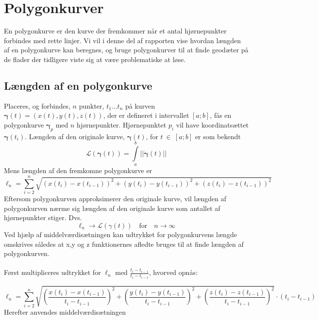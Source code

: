 \section{Polygonkurver}
En polygonkurve er den kurve der fremkommer når et antal hjørnepunkter forbindes med rette linjer. Vi vil i denne del af rapporten vise hvordan længden af en polygonkurve kan beregnes, og bruge polygonkurver til at finde geodæter på de flader der tidligere viste sig at være problematiske at løse.
\subsection{Længden af en polygonkurve}
Placeres, og forbindes, \(n\) punkter, \(t_1...t_n\) på kurven \(\boldsymbol{\gamma}(t)=(x(t),y(t),z(t))\), der er defineret i intervallet \([a;b]\), fås en polygonkurve \(\boldsymbol{\gamma}_p\) med \(n\) hjørnepunkter. Hjørnepunktet \(p_i\) vil have koordinatsættet \(\boldsymbol{\gamma}(t_i)\). Længden af den originale kurve, \(\boldsymbol{\gamma}(t)\), for \(t ~ \in ~ [a;b]\) er som bekendt
\begin{equation}
\mathscr{L}(\boldsymbol{\gamma}(t)) = \int\limits_a^b ||\dot{\boldsymbol{\gamma}}(t)||
\label{curvelength}
\end{equation}
Mens længden af den fremkomne polygonkurve er 
\begin{equation}
\ell _n = \sum\limits_{i=2}^n \sqrt{(x(t_i)-x(t_{i-1}))^2+(y(t_i)-y(t_{i-1}))^2+(z(t_i)-z(t_{i-1}))^2}
\label{polycurvelength}
\end{equation} 
Eftersom polygonkurven approksimerer den originale kurve, vil længden af polygonkurven nærme sig længden af den originale kurve som antallet af hjørnepunkter stiger. Dvs.
\begin{equation}
\ell_n \rightarrow \mathscr{L}(\gamma(t)) \quad \mbox{for} \quad n \rightarrow \infty
\label{polygoestowardscurve}
\end{equation}
Ved hjælp af middelværdisætningen kan udtrykket for polygonkurvens længde omskrives således at x,y og z funktionernes afledte bruges til at finde længden af polygonkurven. \\
\\
Først multipliceres udtrykket for \(\ell_n\) med \(\frac{t_i-t_{i-1}}{t_i-t_{i-1}}\), hvorved opnås:

\begin{equation}
\ell _n = \sum\limits_{i=2}^n \sqrt{\left(\frac{x(t_i)-x(t_{i-1})}{t_i-t_{i-1}}\right)^2+\left(\frac{y(t_i)-y(t_{i-1})}{t_i-t_{i-1}}\right)^2+\left(\frac{z(t_i)-z(t_{i-1})}{t_i-t_{i-1}}\right)^2}\cdot(t_i-t_{i-1})
\end{equation}
Herefter anvendes middelværdisætningen \\

